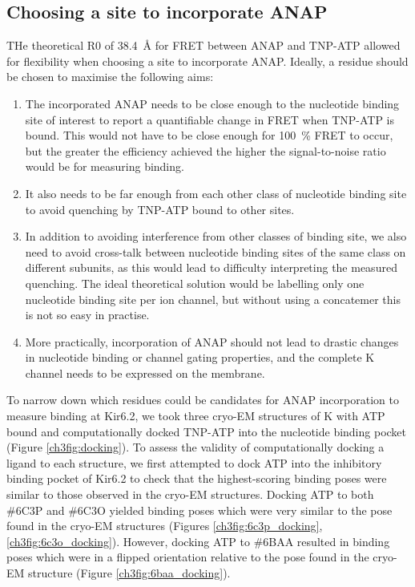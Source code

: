 \subsection{Choosing a site to incorporate ANAP}

THe theoretical R0 of \SI{38.4}{\angstrom} for FRET between ANAP and TNP-ATP allowed for flexibility when choosing a site to incorporate ANAP.
Ideally, a residue should be chosen to maximise the following aims:

\begin{enumerate}
	\item The incorporated ANAP needs to be close enough to the nucleotide binding site of interest to report a quantifiable change in FRET when TNP-ATP is bound.
	This would not have to be close enough for \SI{100}{\percent} FRET to occur, but the greater the efficiency achieved the higher the signal-to-noise ratio would be for measuring binding.
	\item It also needs to be far enough from each other class of nucleotide binding site to avoid quenching by TNP-ATP bound to other sites.
	\item In addition to avoiding interference from other classes of binding site, we also need to avoid cross-talk between nucleotide binding sites of the same class on different subunits, as this would lead to difficulty interpreting the measured quenching.
	The ideal theoretical solution would be labelling only one nucleotide binding site per ion channel, but without using a concatemer this is not so easy in practise.
	\item More practically, incorporation of ANAP should not lead to drastic changes in nucleotide binding or channel gating properties, and the complete K\ATP{} channel needs to be expressed on the membrane.
\end{enumerate}

To narrow down which residues could be candidates for ANAP incorporation to measure binding at Kir6.2, we took three cryo-EM structures of K\ATP{} with ATP bound and computationally docked TNP-ATP into the nucleotide binding pocket (Figure \ref{ch3fig:docking}).
To assess the validity of computationally docking a ligand to each structure, we first attempted to dock ATP into the inhibitory binding pocket of Kir6.2 to check that the highest-scoring binding poses were similar to those observed in the cryo-EM structures.
Docking ATP to both \#6C3P and \#6C3O yielded binding poses which were very similar to the pose found in the cryo-EM structures (Figures \ref{ch3fig:6c3p_docking}, \ref{ch3fig:6c3o_docking}).
However, docking ATP to \#6BAA resulted in binding poses which were in a flipped orientation relative to the pose found in the cryo-EM structure (Figure \ref{ch3fig:6baa_docking}).

